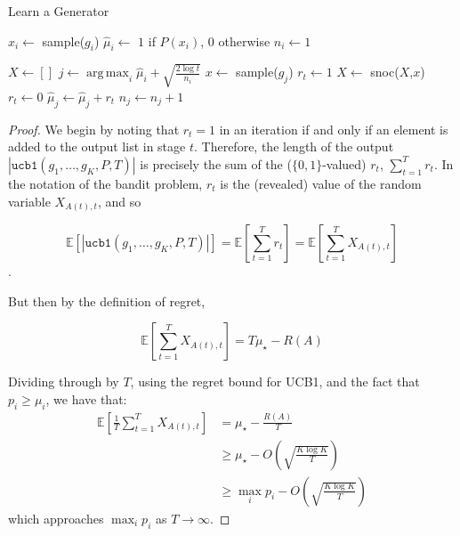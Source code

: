 \documentclass[sigconf,nonacm,review,anonymous]{acmart}
\DeclareMathOperator*{\argmax}{arg\,max}
\begin{document}
\begin{algorithm}
    \caption{Learn a Generator}
    \label{alg:ucb1}
    \begin{algorithmic}
      \State $x_i \gets $ sample($g_i$)
      \State $\hat{\mu}_i \gets$ $1$ if $P(x_i)$, $0$ otherwise
      \State $n_i \gets 1$

      \EndFor
      \State $X \gets []$
        \State $j \gets \argmax_i \hat{\mu}_i + \sqrt{\frac{2\log t}{n_i}}$
        \State $x \gets$ sample($g_j$)
          \State $r_t \gets 1$
          \State $X \gets$ snoc($X$,$x$)
        \Else
          \State $r_t \gets 0$
        \EndIf
        \State $\hat{\mu}_j \gets \hat{\mu}_j + r_t$
        \State $n_j \gets n_j + 1$
      \EndFor
      \EndFunction
    \end{algorithmic}
\end{algorithm}

\regretthm*
\begin{proof}
We begin by noting that $r_t = 1$ in an iteration if and only if an element is added to the output list in stage $t$. Therefore, the length of the output $\left|\texttt{ucb1}(g_1,\dots,g_K,P,T)\right|$ is precisely the sum of the ($\{0,1\}$-valued) $r_t$, $\sum_{t=1}^T r_t$. In the notation of the bandit problem, $r_t$ is the (revealed) value of the random variable $X_{A(t),t}$, and so 

$$\mathbb{E}\left[\left|\texttt{ucb1}(g_1,\dots,g_K,P,T)\right|\right] = \mathbb{E}\left[\sum_{t=1}^T r_t\right] = \mathbb{E}\left[\sum_{t=1}^T X_{A(t),t}\right]$$.

But then by the definition of regret,

$$
\mathbb{E}\left[\sum_{t=1}^T X_{A(t),t}\right] = T\mu_{\star} - R(A)
$$

Dividing through by $T$, using the regret bound for UCB1, and the fact that $p_i \geq \mu_i$, we have that:
\begin{align*}
\mathbb{E}\left[\frac{1}{T}\sum_{t=1}^T X_{A(t),t}\right] &= \mu_\star - \frac{R(A)}{T}\\
&\geq \mu_{\star} - O\left(\sqrt{\frac{K\log K}{T}}\right)\\
&\geq \max_i p_i - O\left(\sqrt{\frac{K\log K}{T}}\right)
\end{align*}
which approaches $\max_i p_i$ as $T \to \infty$.
\end{proof}
\end{document}
